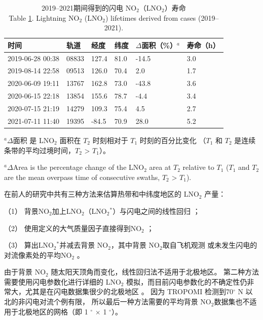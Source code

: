 \begin{table}[!htbp]
\centering
\caption{2019--2021期间得到的闪电 NO$_2$（LNO$_2$）寿命\\
Table \ref{table:lifetime}. Lightning NO$_2$ (LNO$_2$) lifetimes derived from cases (2019--2021).}
\label{table:lifetime}
\footnotesize
{\centering
\begin{tabular}{llllll}
\hline
时间             &         轨道 &    经度 &   纬度 &  $\Delta$面积（\%）$^a$ &  寿命（h）\\
\hline
2019-06-28 00:38 &       08833 &  127.4 &  81.0 &     -14.5 &       3.0 \\
2019-08-14 22:58 &       09513 &  126.0 &  70.4 &       2.0 &       1.7 \\
2020-06-09 19:11 &       13767 &  162.8 &  73.0 &     -43.8 &       3.6 \\
2020-06-15 22:18 &       13854 &  155.6 &  78.7 &      -4.4 &       3.4 \\
2020-07-15 21:19 &       14279 &  109.3 &  75.4 &       4.5 &       2.7 \\
2021-07-11 11:40 &       19395 &  -84.5 &  70.9 &      28.0 &       5.2 \\
\hline
\end{tabular}
\par }
\begin{tablenotes}
\footnotesize
\item $^a$$\Delta$面积 是 LNO$_2$ 面积在 $T_2$ 时刻相对于 $T_1$ 时刻的百分比变化
（$T_1$ 和 $T_2$ 是连续条带的平均过境时间，$T_2$ > $T_1$）。
\item $^a$$\Delta$Area is the percentage change of the LNO$_2$ area at $T_2$ relative to $T_1$
($T_1$ and $T_2$ are the mean overpass time of consecutive swaths, $T_2$ > $T_1$).
\end{tablenotes}
\end{table}


在前人的研究中共有三种方法来估算热带和中纬度地区的 LNO$_2$ 产量：

（1） 背景NO$_2$加上LNO$_2$（LNO$_2$$^*$）与闪电之间的线性回归 \citep{Pickering.2016,Allen.2019,Lapierre.2020}；

（2） 使用定义的大气质量因子直接得到NO$_2$ \citep{Beirle.2009,Zhang.2020b,Zhang.2022a}；

（3） 算出LNO$_2$$^*$并减去背景 NO$_2$，其中背景 NO$_2$取自飞机观测 \citep{Pickering.2016,Perez-Invernon.2022} 或未发生闪电的对流像素处的平均NO$_2$ \citep{Bucsela.2019,Bucsela.2010,Allen.2021a}。

由于背景 NO$_2$ 随太阳天顶角而变化，线性回归法不适用于北极地区。
第二种方法需要使用闪电参数化进行详细的 LNO$_2$ 模拟，而目前闪电参数化的不确定性仍非常大\citep{Finney.2018,Romps.2019,Chen.2021a}，尤其是在闪电数据集很少的北极地区 \citep{Holzworth.2021}。
因为 TROPOMI 检测到70$^{\circ}$ N 以北的非闪电对流个例有限，
所以最后一种方法需要的平均背景 NO$_2$数据集也不适用于北极地区的网格（即 1 $^{\circ}$ $\times$ 1 $^{\circ}$）。


